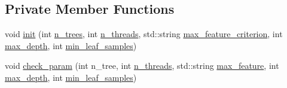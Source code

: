 \subsection*{Private Member Functions}
\begin{DoxyCompactItemize}
\item 
void \hyperlink{class_base_forest_acbd8fb7a63430c5f07633cc5c4e43a3d}{init} (int \hyperlink{class_base_forest_a2549a0057ec5419fe1de52ef198125ce}{n\+\_\+trees}, int \hyperlink{class_base_forest_a94fe86e1b426d149a11d100921cea3a4}{n\+\_\+threads}, std\+::string \hyperlink{class_base_forest_a5c651ace1f9d5177cdff38a0ae4048f7}{max\+\_\+feature\+\_\+criterion}, int \hyperlink{class_base_forest_a85cf2e2e202c6e82bf684057181138f6}{max\+\_\+depth}, int \hyperlink{class_base_forest_a15e0407f3c0fbc4c25e0796c781ff059}{min\+\_\+leaf\+\_\+samples})
\item 
void \hyperlink{class_base_forest_a8d6af13b5f3fbd592d6abe5f6e0e6028}{check\+\_\+param} (int n\+\_\+tree, int \hyperlink{class_base_forest_a94fe86e1b426d149a11d100921cea3a4}{n\+\_\+threads}, std\+::string \hyperlink{class_base_forest_a07e8b0ed27405f469198f2c4875786c9}{max\+\_\+feature}, int \hyperlink{class_base_forest_a85cf2e2e202c6e82bf684057181138f6}{max\+\_\+depth}, int \hyperlink{class_base_forest_a15e0407f3c0fbc4c25e0796c781ff059}{min\+\_\+leaf\+\_\+samples})
\end{DoxyCompactItemize}


